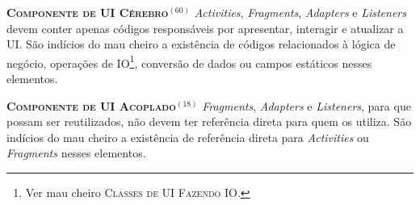   \noindent
  \textsc{\textbf{{\small Componente de UI Cérebro}}}$^{(60)}$ \textit{Activities}, \textit{Fragments}, \textit{Adapters} e \textit{Listeners} devem conter apenas códigos responsáveis por apresentar, interagir e atualizar a UI. São indícios do mau cheiro a existência de códigos relacionados à lógica de negócio, operações de IO\footnote{Ver mau cheiro \textsc{\small Classes de UI Fazendo IO}.}, conversão de dados ou campos estáticos nesses elementos.


  \noindent
  \textbf{\textsc{{\small Componente de UI Acoplado}}}$^{(18)}$ \textit{Fragments}, \textit{Adapters} e \textit{Listeners}, para que possam ser reutilizados, não devem ter referência direta para quem os utiliza. São indícios do mau cheiro a existência de referência direta para \textit{Activities} ou \textit{Fragments} nesses elementos.


